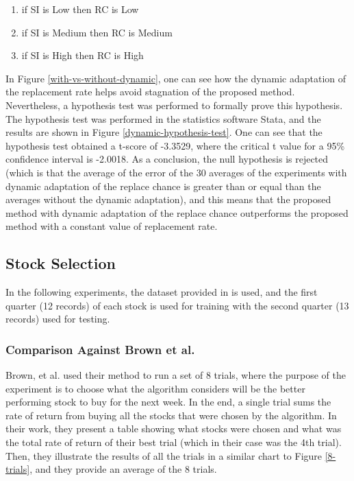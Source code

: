\documentclass[a4paper,twoside]{article}
\begin{document}
\begin{enumerate}
\item if SI is Low then RC is Low
\item if SI is Medium then RC is Medium
\item if SI is High then RC is High
\end{enumerate}

In Figure \ref{with-vs-without-dynamic}, one can see how the dynamic
adaptation of the replacement rate helps avoid stagnation of the
proposed method. Nevertheless, a hypothesis test was performed to
formally prove this hypothesis. The hypothesis test was performed in
the statistics software Stata, and the results are shown in Figure
\ref{dynamic-hypothesis-test}. One can see that the hypothesis test
obtained a t-score of -3.3529, where the critical t value for a 95\%
confidence interval is -2.0018. As a conclusion, the null hypothesis
is rejected (which is that the average of the error of the 30 averages
of the experiments with dynamic adaptation of the replace chance is
greater than or equal than the averages without the dynamic
adaptation), and this means that the proposed method with dynamic
adaptation of the replace chance outperforms the proposed method with
a constant value of replacement rate. 

\subsection{Stock Selection}

In the following experiments, the dataset provided in
\cite{brown2013dynamic} is used, and the first quarter (12 records) of
each stock is used for training with the second quarter (13 records)
used for testing. 

\subsubsection{Comparison Against Brown et al.}

Brown, et al. \cite{brown2013dynamic} used their method to run a set
of 8 trials, where the purpose of the experiment is to choose what the
algorithm considers will be the better performing stock to buy for the
next week. In the end, a single trial sums the rate of return from
buying all the stocks that were chosen by the algorithm. In their
work, they present a table showing what stocks were chosen and what
was the total rate of return of their best trial (which in their case
was the 4th trial). Then, they illustrate the results of all the
trials in a similar chart to Figure \ref{8-trials}, and they provide
an average of the 8 trials. 
\end{document}
